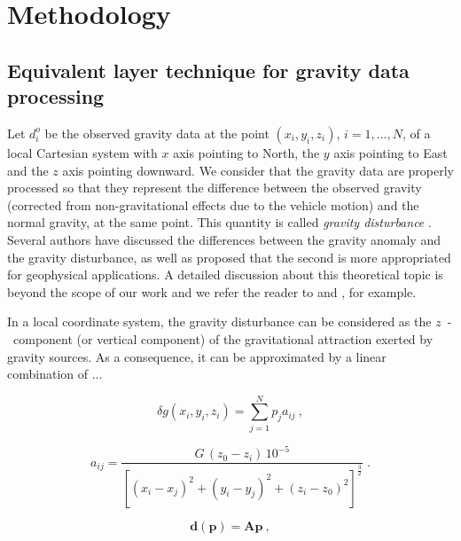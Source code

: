 \documentclass[manuscript,revised]{geophysics}
\begin{document}
\section*{Methodology}

\subsection{Equivalent layer technique for gravity data processing}

Let $d^{o}_{i}$ be the observed gravity data at
the point $(x_{i}, y_{i}, z_{i})$, $i = 1, ..., N$, of a local Cartesian
system with $x$ axis pointing to North, the $y$ axis pointing to East and 
the $z$ axis pointing downward.
We consider that the gravity data are properly processed so that they
represent the difference between the observed gravity
(corrected from non-gravitational effects due to the vehicle motion) 
and the normal gravity, at the same point. This quantity is called
\textit{gravity disturbance} \citep{hofmann-wellenhof-moritz2005}. 
Several authors have discussed the differences between the gravity 
anomaly and the gravity disturbance, as well as proposed that the second 
is more appropriated for geophysical applications. A detailed discussion
about this theoretical topic is beyond the scope of our work and we
refer the reader to \citet{li-gotze2001, fairhead-etal2003, 
hackney-featherstone2003, hinze-etal2005} and 
\citet{vajda-etal2006, vajda-etal2007, vajda-etal2008}, for example.

In a local coordinate system, the gravity disturbance can be considered 
as the $z$~-~component (or vertical component) of the gravitational 
attraction exerted by gravity sources. As a consequence, it can be
approximated by a linear combination of ...

\begin{equation}
\delta g(x_{i}, y_{i}, z_{i}) = \sum_{j=1}^{N} p_j a_{ij} \: ,
\label{eq:predicted-data-i}
\end{equation}

\begin{equation}
a_{ij}= \frac{G \, (z_{0} - z_{i}) \, 10^{-5}}{\left[(x_{i} - x_{j})^{2} +
(y_{i} - y_{j})^{2} +	(z_{i} - z_{0})^{2} \right]^{\frac{3}{2}}} \; .
\label{eq:aij}
\end{equation}

\begin{equation}
\mathbf{d}(\mathbf{p}) = \mathbf{A} \mathbf{p} \: ,
\label{eq:predicted-data-vector}
\end{equation}
\end{document}
